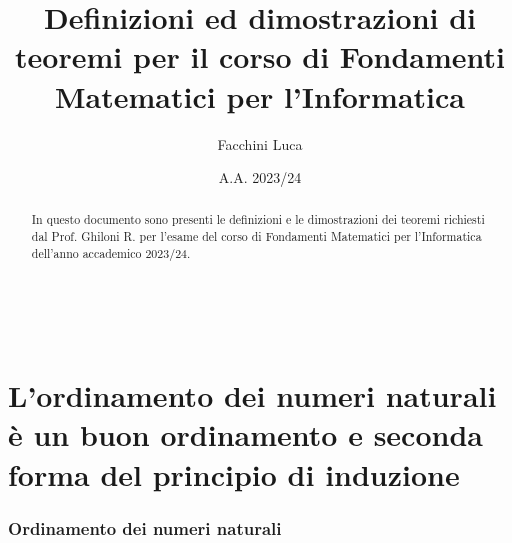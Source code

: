 \documentclass{article}
\title{Definizioni ed dimostrazioni di teoremi per il corso di Fondamenti Matematici per l'Informatica}
\author{Facchini Luca}
\date{A.A. 2023/24}
\theoremstyle{definition}
\begin{document}
\maketitle
\begin{abstract}
    In questo documento sono presenti le definizioni e le dimostrazioni dei teoremi richiesti dal Prof. Ghiloni R. per l'esame del corso di Fondamenti Matematici per l'Informatica dell'anno accademico 2023/24.
\end{abstract}
\
\tableofcontents
\pagebreak
\part[Ordinamento numeri naturali e seconda forma induzione]{L’ordinamento dei numeri naturali è un buon ordinamento e seconda forma del principio di induzione}
    \section{Ordinamento dei numeri naturali}
\end{document}
